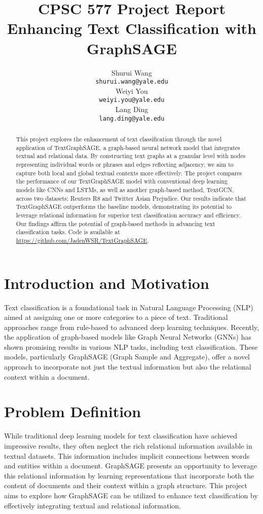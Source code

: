 \documentclass{article}
\title{CPSC 577 Project Report\\Enhancing Text Classification with GraphSAGE}
\author{%
  Shurui Wang \\
  \texttt{shurui.wang@yale.edu} \\
  \And
  Weiyi You \\
  \texttt{weiyi.you@yale.edu} \\
  \And
  Lang Ding \\
  \texttt{lang.ding@yale.edu} \\
}
\begin{document}
\maketitle
\begin{abstract}
  This project explores the enhancement of text classification through the novel application of TextGraphSAGE, a graph-based neural network model that integrates textual and relational data. By constructing text graphs at a granular level with nodes representing individual words or phrases and edges reflecting adjacency, we aim to capture both local and global textual contexts more effectively. The project compares the performance of our TextGraphSAGE model with conventional deep learning models like CNNs and LSTMs, as well as another graph-based method, TextGCN, across two datasets: Reuters R8 and Twitter Asian Prejudice. Our results indicate that TextGraphSAGE outperforms the baseline models, demonstrating its potential to leverage relational information for superior text classification accuracy and efficiency. Our findings affirm the potential of graph-based methods in advancing text classification tasks. Code is available at \href{https://github.com/JadenWSR/TextGraphSAGE}{https://github.com/JadenWSR/TextGraphSAGE}.
\end{abstract}
\section{Introduction and Motivation}

Text classification is a foundational task in Natural Language Processing (NLP) aimed at assigning one or more categories to a piece of text. Traditional approaches range from rule-based to advanced deep learning techniques. Recently, the application of graph-based models like Graph Neural Networks (GNNs) has shown promising results in various NLP tasks, including text classification. These models, particularly GraphSAGE (Graph Sample and Aggregate), offer a novel approach to incorporate not just the textual information but also the relational context within a document.

\section{Problem Definition}

While traditional deep learning models for text classification have achieved impressive results, they often neglect the rich relational information available in textual datasets. This information includes implicit connections between words and entities within a document. GraphSAGE presents an opportunity to leverage this relational information by learning representations that incorporate both the content of documents and their context within a graph structure. This project aims to explore how GraphSAGE can be utilized to enhance text classification by effectively integrating textual and relational information.
\end{document}
